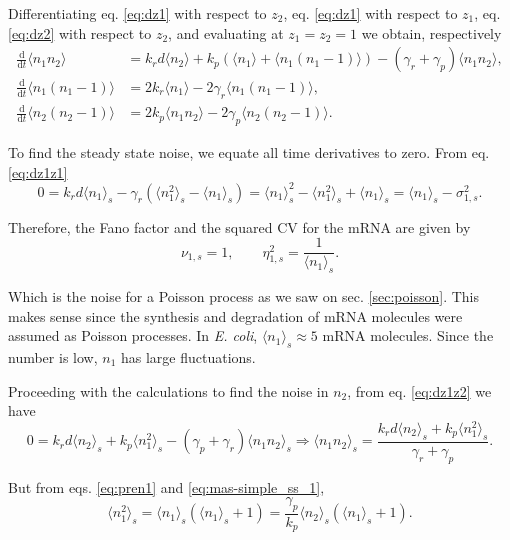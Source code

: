 Differentiating eq. \eqref{eq:dz1} with respect to $z_2$, eq. \eqref{eq:dz1} with respect to $z_1$, eq. \eqref{eq:dz2} with respect to $z_2$, and evaluating at $z_1 = z_2 = 1$ we obtain, respectively
\begin{align}
  \frac{\mathrm{d}}{\mathrm{d}t}\langle n_1n_2\rangle &= k_rd\langle n_2 \rangle + k_p\left(\langle n_1\rangle + \langle n_1(n_1-1) \rangle \right) - \left( \gamma_r + \gamma_p \right)\langle n_1n_2 \rangle,\label{eq:dz1z2}\\
  \frac{\mathrm{d}}{\mathrm{d}t}\langle n_1(n_1-1)\rangle &= 2k_r\langle n_1\rangle-2\gamma_r\langle n_1(n_1-1) \rangle, \label{eq:dz1z1}\\
  \frac{\mathrm{d}}{\mathrm{d}t}\langle n_2(n_2-1)\rangle &= 2k_p\langle n_1n_2 \rangle - 2\gamma_p\langle n_2(n_2-1)\rangle. \label{eq:dz2z2}
\end{align}

To find the steady state noise, we equate all time derivatives to zero. From  eq. \eqref{eq:dz1z1}
\begin{equation}
  \label{eq:pren1}
  0 = k_rd \langle n_1 \rangle_s -\gamma_r \left(\langle n_1^2 \rangle_s - \langle n_1 \rangle_s \right) = \langle n_1 \rangle_s^2 - \langle n_1^2 \rangle_s + \langle n_1 \rangle_s = \langle n_1 \rangle_s - \sigma_{1,s}^2.
\end{equation}

Therefore, the Fano factor and the squared CV for the mRNA are given by
\begin{equation}
  \label{noise1}
  \nu_{1,s} = 1, \quad\quad \eta_{1,s}^2 = \frac{1}{\langle n_1 \rangle_s}.
\end{equation}

Which is the noise for a Poisson process as we saw on sec. \ref{sec:poisson}. This makes sense since the synthesis and degradation of mRNA molecules were assumed as Poisson processes. In \textit{E. coli}, $\langle n_1\rangle_s \approx 5$ mRNA molecules. Since the number is low, $n_1$ has large fluctuations.

Proceeding with the calculations to find the noise in $n_2$, from eq. \eqref{eq:dz1z2} we have
\begin{equation*}
  0 = k_rd \langle n_2 \rangle_s + k_p \langle n_1^2 \rangle_s - (\gamma_p + \gamma_r) \langle n_1n_2 \rangle_s \Rightarrow \langle n_1n_2 \rangle_s  = \frac{k_rd\langle n_2\rangle_s+k_p\langle n_1^2\rangle_s}{\gamma_r+\gamma_p}.
\end{equation*}

But from eqs. \eqref{eq:pren1} and \eqref{eq:mas-simple_ss_1},
\begin{equation}
\langle n_1^2 \rangle_s = \langle n_1 \rangle_s\left( \langle n_1 \rangle_s+1\right) = \frac{\gamma_p}{k_p}\langle n_2 \rangle_s\left(\langle n_1\rangle_s + 1\right).
\end{equation}

